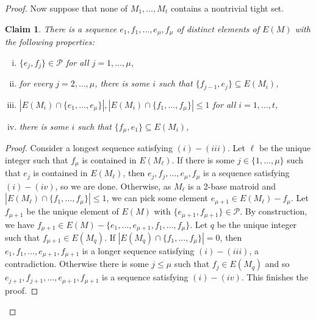 \documentclass{article}
\newtheorem{Claim}[Statement]{Claim}
\begin{document}
\begin{proof}
Now suppose that none of $M_1,\ldots,M_t$ contains a nontrivial tight set.
\begin{Claim}
There is a  sequence $e_1,f_1,\ldots,e_\mu,f_\mu$ of distinct elements of  $E(M)$ with the following properties:
\begin{enumerate}[(i)]
\item $\{e_j,f_j\} \in \mathcal{P}$ for all $j=1,\ldots,\mu$,
\item for every $j=2,\ldots,\mu$, there is some  $i$ such that $\{f_{j-1},e_j\}\subseteq E(M_i)$,
\item $|E(M_i)\cap \{e_1,\ldots,e_\mu\}|,|E(M_i)\cap \{f_1,\ldots,f_\mu\}|\leq 1$ for all $i=1,\ldots,t$,
\item there is some  $i$ such that $\{f_{\mu},e_1\}\subseteq E(M_i)$,
\end{enumerate}
\end{Claim}
\begin{proof}
Consider a longest sequence satisfying $(i)-(iii)$. Let $\ell$ be the unique integer such that $f_{\mu}$ is contained in $E(M_{\ell})$. If there is some $j \in \{1,\ldots,\mu\}$ such that $e_j$ is contained in $E(M_{\ell})$, then $e_j,f_j,\ldots,e_\mu,f_\mu$ is a sequence satisfying $(i)-(iv)$, so we are done. Otherwise, as $M_\ell$ is a 2-base matroid and $|E(M_\ell)\cap \{f_1,\ldots,f_\mu\}|\leq 1$, we can pick some element $e_{\mu+1}\in E(M_\ell)-f_\mu$. Let $f_{\mu+1}$ be the unique element of $E(M)$ with $\{e_{\mu+1},f_{\mu+1}\} \in \mathcal{P}$. By construction, we have $f_{\mu+1}\in E(M)-\{e_1,\ldots,e_{\mu+1},f_1,\ldots,f_{\mu}\}$. Let $q$ be the unique integer such that $f_{\mu+1}\in E(M_q)$. If $|E(M_q)\cap \{f_1,\ldots,f_\mu\}|=0$, then $e_1,f_1,\ldots,e_{\mu+1},f_{\mu+1}$ is a longer sequence satisfying $(i)-(iii)$, a contradiction. Otherwise there is some $j\leq \mu$ such that $f_j\in E(M_q)$ and so $e_{j+1},f_{j+1},\ldots,e_{\mu+1},f_{\mu+1}$ is a sequence satisfying $(i)-(iv)$. This finishes the proof. 




\end{proof}
\end{proof}
\end{document}
